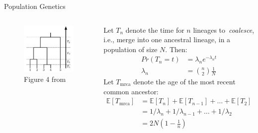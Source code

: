 \begin{frame}{Population Genetics}
\begin{columns}
 \column{2.5in}
\begin{figure}[!h]
\begin{center}
\includegraphics[scale=.45]{FIGURES/coaltimes.jpg}
\caption{Figure 4 from~\cite{volz2013}}
\end{center}
\end{figure}
 \column{2.5in}
 Let $T_n$ denote the time for $n$ lineages to~\textit{coalesce}, i.e., merge into one ancestral lineage, in a population of size $N$.
 Then:
\begin{align*}
Pr(T_n = t) &= \lambda_n e^{-\lambda_nt}\\
\lambda_n &= \binom{n}{2}\frac{1}{N}
\end{align*}
Let $T_{\text{mrca}}$ denote the age of the most recent common ancestor:
\begin{align*}
 \mathbb{E}[T_{\text{mrca}}] &= \mathbb{E}[T_n] + \mathbb{E}[T_{n-1}] + \ldots + \mathbb{E}[T_2]\\
 &= 1/\lambda_n + 1/\lambda_{n-1} + \ldots + 1/\lambda_2\\
 &= 2N(1-\frac{1}{n})
\end{align*}

\end{columns}
\end{frame}
